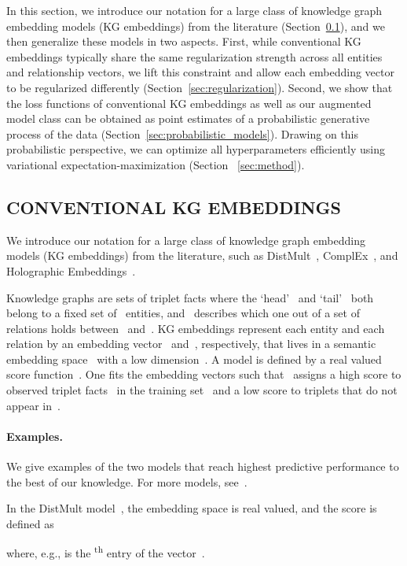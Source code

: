 \documentclass[letterpage]{article}
\begin{document}
In this section, we introduce our notation for a large class of knowledge graph embedding models (KG embeddings) from the literature (Section~\ref{sec:conventional_models}), and we then generalize these models in two aspects.
First, while conventional KG embeddings typically share the same regularization strength across all entities and relationship vectors, we lift this constraint and allow each embedding vector to be regularized differently (Section~\ref{sec:regularization}).
Second, we show that the loss functions of conventional KG embeddings as well as our augmented model class can be obtained as point estimates of a probabilistic generative process of the data (Section~\ref{sec:probabilistic_models}).
Drawing on this probabilistic perspective, we can optimize all hyperparameters efficiently using variational expectation-maximization (Section ~\ref{sec:method}).


\subsection{CONVENTIONAL KG EMBEDDINGS}
\label{sec:conventional_models}

We introduce our notation for a large class of knowledge graph embedding models (KG embeddings) from the literature, such as DistMult~\citep{BWXJL2015}, ComplEx~\citep{TWR2016}, and Holographic Embeddings~\citep{NRP2016}.

Knowledge graphs are sets of triplet facts  where the `head'~ and `tail'~ both belong to a fixed set of~ entities, and~ describes which one out of a set of~ relations holds between~ and~.
KG embeddings represent each entity  and each relation  by an embedding vector~ and~, respectively, that lives in a semantic embedding space~ with a low dimension~.
A model is defined by a real valued score function~.
One fits the embedding vectors such that~ assigns a high score to observed triplet facts~ in the training set~ and a low score to triplets that do not appear in~.


\paragraph{Examples.}
We give examples of the two models that reach highest predictive performance to the best of our knowledge.
For more models, see~\citep{KBK2017}.

In the DistMult model~\citep{BWXJL2015}, the embedding space  is real valued, and the score is defined as

where, e.g.,  is the \textsuperscript{th} entry of the vector~.
\end{document}
